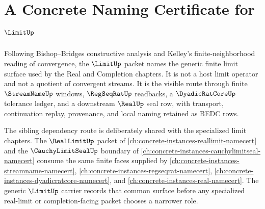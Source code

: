 \chapter{A Concrete Naming Certificate for $\LimitUp$}
\label{ch:concrete-instances-limit-namecert}

Following Bishop--Bridges constructive analysis and Kelley's finite-neighborhood reading of convergence, the $\LimitUp$ packet names the generic finite limit surface used by the Real and Completion chapters. It is not a host limit operator and not a quotient of convergent streams. It is the visible route through finite $\StreamNameUp$ windows, $\RegSeqRatUp$ readbacks, a $\DyadicRatCoreUp$ tolerance ledger, and a downstream $\RealUp$ seal row, with transport, continuation replay, provenance, and local naming retained as BEDC rows.

The sibling dependency route is deliberately shared with the specialized limit chapters. The $\RealLimitUp$ packet of \autoref{ch:concrete-instances-reallimit-namecert} and the $\CauchyLimitSealUp$ boundary of \autoref{ch:concrete-instances-cauchylimitseal-namecert} consume the same finite faces supplied by \autoref{ch:concrete-instances-streamname-namecert}, \autoref{ch:concrete-instances-regseqrat-namecert}, \autoref{ch:concrete-instances-dyadicratcore-namecert}, and \autoref{ch:concrete-instances-real-namecert}. The generic $\LimitUp$ carrier records that common surface before any specialized real-limit or completion-facing packet chooses a narrower role.

